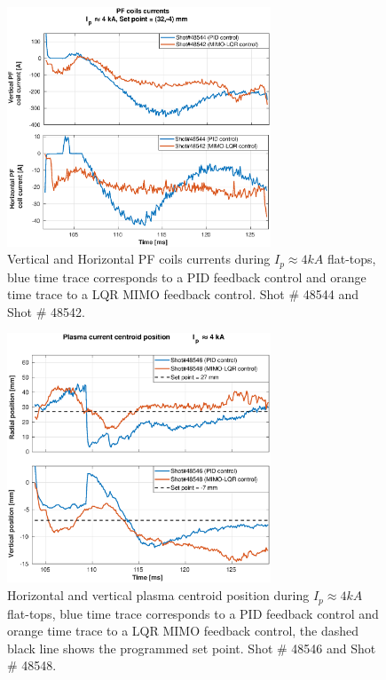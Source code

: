 \begin{figure}
	\centering
	\includegraphics[width=0.7\textwidth]{Chp5/PIDvsMIMO_544_542_curr_2.eps}
	\caption{   Vertical and Horizontal PF coils currents during  $I_p\approx 4kA$  flat-tops, blue time trace corresponds to a PID feedback control and orange time trace to a LQR MIMO feedback control. Shot $\#$ 48544 and Shot $\#$ 48542.}
\end{figure}

\begin{figure}
	\centering
	\includegraphics[width=0.7\textwidth]{Chp5/PIDvsMIMO_546_548_2.eps}
	\caption{Horizontal and vertical plasma centroid position during  $I_p\approx 4kA$  flat-tops, blue time trace corresponds to a PID feedback control and orange time trace to a LQR MIMO feedback control, the dashed black line shows the programmed set point.  Shot $ \# $ 48546 and Shot $ \#  $ 48548.}
\end{figure}

